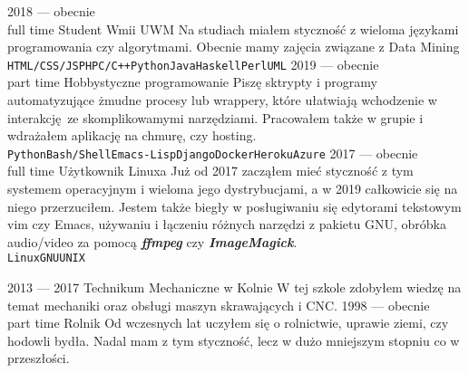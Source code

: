 \documentclass[9pt]{developercv} %
\begin{document}
\begin{entrylist}
    \entry
    {2018 --- obecnie\\\footnotesize{full time}}
    {Student}
    {Wmii UWM}
    {Na studiach miałem styczność z wieloma językami programowania czy algorytmami. Obecnie mamy zajęcia związane z Data Mining\\ \texttt{HTML/CSS/JS}\slashsep\texttt{PHP}\slashsep\texttt{C/C++}\slashsep\texttt{Python}\slashsep\texttt{Java}\slashsep\texttt{Haskell}\slashsep\texttt{Perl}\slashsep\texttt{UML}}
    \entry
    {2019 --- obecnie\\\footnotesize{part time}}
    {Hobbystyczne programowanie}
    {}
    {Piszę sktrypty i programy automatyzujące żmudne procesy lub wrappery, które ułatwiają wchodzenie w interakcję ze skomplikowamymi narzędziami. Pracowałem także w grupie i wdrażałem aplikację na chmurę, czy hosting.\\ \texttt{Python}\slashsep\texttt{Bash/Shell}\slashsep\texttt{Emacs-Lisp}\slashsep\texttt{Django}\slashsep\texttt{Docker}\slashsep\texttt{Heroku}\slashsep\texttt{Azure}}
    \entry
    {2017 --- obecnie\\\footnotesize{full time}}
    {Użytkownik Linuxa}
    {}
    {Już od 2017 zacząłem mieć styczność z tym systemem operacyjnym i wieloma jego dystrybucjami, a w 2019 całkowicie się na niego przerzuciłem. Jestem także biegły w posługiwaniu się edytorami tekstowym vim czy Emacs, używaniu i łączeniu różnych narzędzi z pakietu GNU, obróbka audio/video za pomocą \textbf{\textit{ffmpeg}} czy \textbf{\textit{ImageMagick}}.\\ \texttt{Linux}\slashsep\texttt{GNU}\slashsep\texttt{UNIX}}
\end{entrylist}



\begin{entrylist}
    \entry
    {2013 --- 2017}
    {Technikum Mechaniczne w Kolnie}
    {}
    {W tej szkole zdobyłem wiedzę na temat mechaniki oraz obsługi maszyn skrawających i CNC.}
    \entry
    {1998 --- obecnie\\\footnotesize{part time}}
    {Rolnik}
    {}
    {Od wczesnych lat uczyłem się o rolnictwie, uprawie ziemi, czy hodowli bydła. Nadal mam z tym styczność, lecz w dużo mniejszym stopniu co w przeszłości.}
\end{entrylist}
\end{document}
